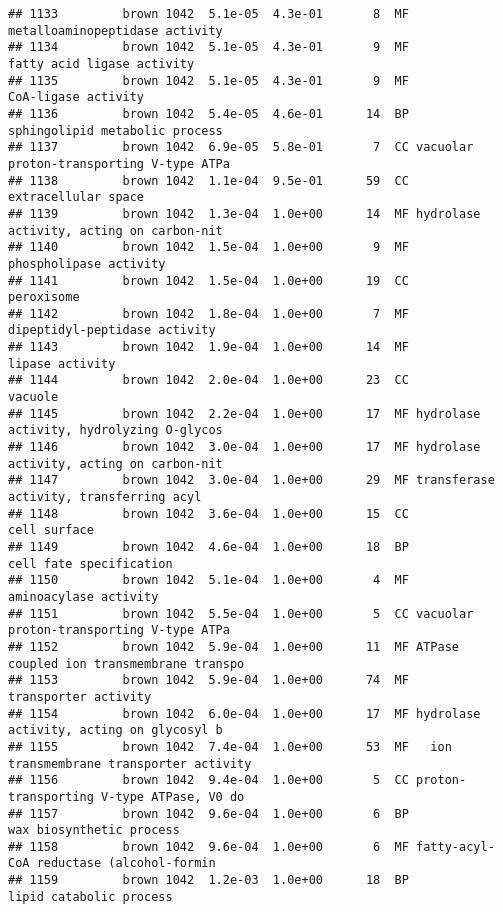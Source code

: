 \documentclass[]{article}
\begin{document}
\begin{verbatim}
## 1133         brown 1042  5.1e-05  4.3e-01       8  MF           metalloaminopeptidase activity
## 1134         brown 1042  5.1e-05  4.3e-01       9  MF               fatty acid ligase activity
## 1135         brown 1042  5.1e-05  4.3e-01       9  MF                      CoA-ligase activity
## 1136         brown 1042  5.4e-05  4.6e-01      14  BP           sphingolipid metabolic process
## 1137         brown 1042  6.9e-05  5.8e-01       7  CC vacuolar proton-transporting V-type ATPa
## 1138         brown 1042  1.1e-04  9.5e-01      59  CC                      extracellular space
## 1139         brown 1042  1.3e-04  1.0e+00      14  MF hydrolase activity, acting on carbon-nit
## 1140         brown 1042  1.5e-04  1.0e+00       9  MF                   phospholipase activity
## 1141         brown 1042  1.5e-04  1.0e+00      19  CC                               peroxisome
## 1142         brown 1042  1.8e-04  1.0e+00       7  MF            dipeptidyl-peptidase activity
## 1143         brown 1042  1.9e-04  1.0e+00      14  MF                          lipase activity
## 1144         brown 1042  2.0e-04  1.0e+00      23  CC                                  vacuole
## 1145         brown 1042  2.2e-04  1.0e+00      17  MF hydrolase activity, hydrolyzing O-glycos
## 1146         brown 1042  3.0e-04  1.0e+00      17  MF hydrolase activity, acting on carbon-nit
## 1147         brown 1042  3.0e-04  1.0e+00      29  MF transferase activity, transferring acyl 
## 1148         brown 1042  3.6e-04  1.0e+00      15  CC                             cell surface
## 1149         brown 1042  4.6e-04  1.0e+00      18  BP                  cell fate specification
## 1150         brown 1042  5.1e-04  1.0e+00       4  MF                    aminoacylase activity
## 1151         brown 1042  5.5e-04  1.0e+00       5  CC vacuolar proton-transporting V-type ATPa
## 1152         brown 1042  5.9e-04  1.0e+00      11  MF ATPase coupled ion transmembrane transpo
## 1153         brown 1042  5.9e-04  1.0e+00      74  MF                     transporter activity
## 1154         brown 1042  6.0e-04  1.0e+00      17  MF hydrolase activity, acting on glycosyl b
## 1155         brown 1042  7.4e-04  1.0e+00      53  MF   ion transmembrane transporter activity
## 1156         brown 1042  9.4e-04  1.0e+00       5  CC proton-transporting V-type ATPase, V0 do
## 1157         brown 1042  9.6e-04  1.0e+00       6  BP                 wax biosynthetic process
## 1158         brown 1042  9.6e-04  1.0e+00       6  MF fatty-acyl-CoA reductase (alcohol-formin
## 1159         brown 1042  1.2e-03  1.0e+00      18  BP                  lipid catabolic process

\end{verbatim}
\end{document}
